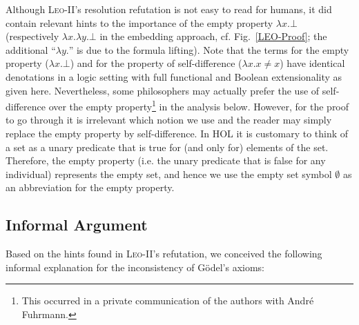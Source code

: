\documentclass{article}
\begin{document}
Although \textsc{Leo-II}'s resolution refutation is not easy to read
for humans, it did contain relevant hints to the importance of the
empty property $\lambda x. \bot$ (respectively $\lambda x. \lambda
y. \bot$ in the embedding approach, cf. Fig.~\ref{LEO-Proof}; the 
additional ``$\lambda y.$'' is due to the formula lifting).
%
Note that the terms for the empty property ($\lambda x. \bot$) and for the property of self-difference ($\lambda x.  x\not=x$) have identical denotations in a logic setting
with full functional and Boolean extensionality as given
here. Nevertheless, some philosophers may actually prefer the use of
self-difference over the empty property\footnote{This occurred in
  a private communication of the authors with Andr\'e Fuhrmann.} in
the analysis below. However, for the proof to go through it is
irrelevant which notion we use and the reader may simply replace the
empty property by self-difference. In HOL it is customary to think of
a set as a unary predicate that is true for (and only for) elements of
the set. Therefore, the empty property (i.e. the unary predicate that
is false for any individual) represents the empty set, and hence we
use the empty set symbol $\emptyset$ as an abbreviation for the empty
property. 



\subsection{Informal Argument} \label{sec:arg1}
Based on the hints found in \textsc{Leo-II}'s refutation, we conceived the following informal explanation for the inconsistency of G\"odel's axioms:
\end{document}
